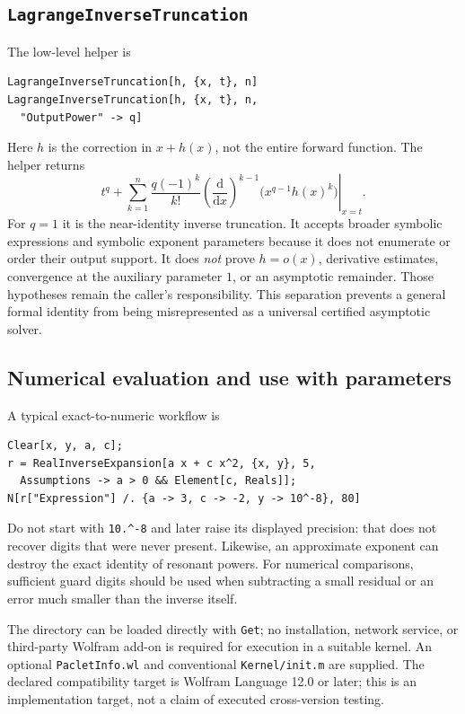 \documentclass[11pt,a4paper]{article}
\numberwithin{equation}{section}
\theoremstyle{definition}
\newcommand{\dd}{\mathrm d}
\newcommand{\code}[1]{\texttt{#1}}
\begin{document}
\subsection{\texttt{LagrangeInverseTruncation}}
The low-level helper is
\begin{lstlisting}
LagrangeInverseTruncation[h, {x, t}, n]
LagrangeInverseTruncation[h, {x, t}, n,
  "OutputPower" -> q]
\end{lstlisting}
Here $h$ is the correction in $x+h(x)$, not the entire forward function.
The helper returns
\begin{equation}\label{eq:helper}
 t^q+\sum_{k=1}^{n}\frac{q(-1)^k}{k!}
 \left.\left(\frac{\dd}{\dd x}\right)^{k-1}
       \bigl(x^{q-1}h(x)^k\bigr)\right|_{x=t}.
\end{equation}
For $q=1$ it is the near-identity inverse truncation. It accepts broader
symbolic expressions and symbolic exponent parameters because it does
not enumerate or order their output support. It does \emph{not} prove
$h=o(x)$, derivative estimates, convergence at the auxiliary parameter
$1$, or an asymptotic remainder. Those hypotheses remain the caller's
responsibility. This separation prevents a general formal identity from
being misrepresented as a universal certified asymptotic solver.

\subsection{Numerical evaluation and use with parameters}
A typical exact-to-numeric workflow is
\begin{lstlisting}
Clear[x, y, a, c];
r = RealInverseExpansion[a x + c x^2, {x, y}, 5,
  Assumptions -> a > 0 && Element[c, Reals]];
N[r["Expression"] /. {a -> 3, c -> -2, y -> 10^-8}, 80]
\end{lstlisting}
Do not start with \lstinline|10.^-8| and later raise its displayed precision:
that does not recover digits that were never present. Likewise, an
approximate exponent can destroy the exact identity of resonant powers.
For numerical comparisons, sufficient guard digits should be used when
subtracting a small residual or an error much smaller than the inverse
itself.

The directory can be loaded directly with \code{Get}; no installation,
network service, or third-party Wolfram add-on is required for execution
in a suitable kernel. An optional \code{PacletInfo.wl} and conventional
\code{Kernel/init.m} are supplied. The declared compatibility target is
Wolfram Language 12.0 or later; this is an implementation target, not a
claim of executed cross-version testing.
\end{document}

